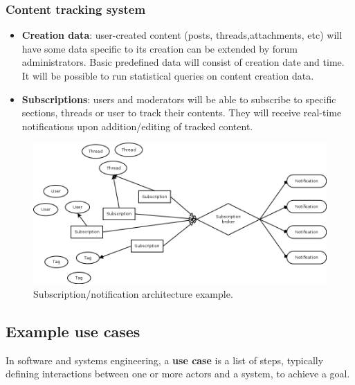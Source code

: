 \documentclass[12pt]{report}
\renewcommand\emph{\textbf}
\begin{document}
                      \subsubsection{Content tracking system}
                        \begin{itemize}
                            \item \emph{Creation data}: user-created content (posts, threads,attachments, etc) will have some data specific to its creation can be extended by forum administrators. Basic predefined data will consist of creation date and time. It will be possible to run statistical queries on content creation data.
                            \item \emph{Subscriptions}: users and moderators will be able to subscribe to specific sections, threads or user to track their contents. They will receive real-time notifications upon addition/editing of tracked content.
                        \end{itemize}

                        \begin{figure}[!htb]
                        \caption{Subscription/notification architecture example.}
                        \centering
                        \includegraphics[width=1\textwidth]{ed/hier_sub}
                        \end{figure}

                \newpage

                \subsection{Example use cases}
                    In software and systems engineering, a \emph{use case} is a list of steps, typically defining interactions between one or more actors and a system, to achieve a goal.
\end{document}
